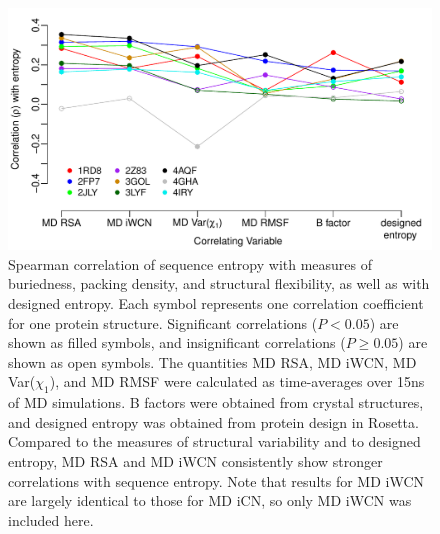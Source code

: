 \documentclass[smallextended]{svjour3}
\begin{document}
\begin{figure}[tbh]
\begin{center}
    \includegraphics[width=5in]{cor_entropy_all.pdf} %
\end{center}
\caption{Spearman correlation of sequence entropy with measures of buriedness, packing density, and structural flexibility, as well as with designed entropy. Each symbol represents one correlation coefficient for one protein structure. Significant correlations ($P<0.05$) are shown as filled symbols, and insignificant correlations ($P\geq0.05$) are shown as open symbols. The quantities MD RSA, MD iWCN, MD Var($\chi_1$), and MD RMSF were calculated as time-averages over 15ns of MD simulations. B factors were obtained from crystal structures, and designed entropy was obtained from protein design in Rosetta. Compared to the measures of structural variability and to designed entropy, MD RSA and MD iWCN consistently show stronger correlations with sequence entropy. Note that results for MD iWCN are largely identical to those for MD iCN, so only MD iWCN was included here.}
\label{fig:cor_entropy_all}
\end{figure}
\end{document}
